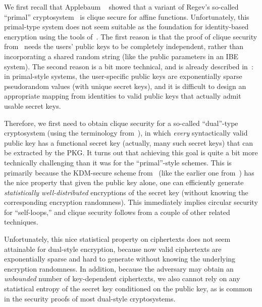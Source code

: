 We first recall that Applebaum
\etal~\cite{DBLP:conf/crypto/ApplebaumCPS09} showed that a variant of
Regev's so-called ``primal'' \lwe
cryptosystem~\cite{DBLP:journals/jacm/Regev09} is clique secure for
affine functions.  Unfortunately, this primal-type system does not
seem suitable as the foundation for identity-based encryption using
the tools of~\cite{DBLP:conf/stoc/GentryPV08}.  The first reason is
that the proof of clique security
from~\cite{DBLP:conf/crypto/ApplebaumCPS09} needs the users' public
keys to be completely independent, rather than incorporating a shared
random string (like the public parameters in an IBE system).  The
second reason is a bit more technical, and is already described
in~\cite{DBLP:conf/stoc/GentryPV08}: in primal-style systems, the
user-specific public keys are exponentially sparse pseudorandom values
(with unique secret keys), and it is difficult to design an
appropriate mapping from identities to valid public keys that actually
admit usable secret keys.

Therefore, we first need to obtain clique security for a so-called
``dual''-type cryptosystem (using the terminology
from~\cite{DBLP:conf/stoc/GentryPV08}), in which \emph{every}
syntactically valid public key has a functional secret key (actually,
many such secret keys) that can be extracted by the PKG.  It turns out
that achieving this goal is quite a bit more technically challenging
than it was for the ``primal''-style schemes.  This is primarily
because the KDM-secure scheme
from~\cite{DBLP:conf/crypto/ApplebaumCPS09} (like the earlier one
from~\cite{DBLP:conf/crypto/BonehHHO08}) has the nice property that
given the public key alone, one can efficiently generate
\emph{statistically well-distributed} encryptions of the secret key
(without knowing the corresponding encryption randomness).  This
immediately implies circular security for ``self-loops,'' and clique
security follows from a couple of other related techniques.

Unfortunately, this nice statistical property on ciphertexts does not
seem attainable for dual-style \lwe encryption, because now valid
ciphertexts are exponentially sparse and hard to generate without
knowing the underlying encryption randomness.  In addition, because
the adversary may obtain an \emph{unbounded} number of key-dependent
ciphertexts, we also cannot rely on any statistical entropy of the
secret key conditioned on the public key, as is common in the security
proofs of most dual-style cryptosystems.


